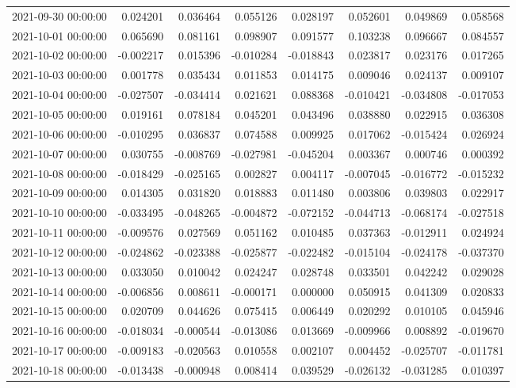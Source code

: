 \begin{tabular}{lrrrrrrr}
2021-09-30 00:00:00 & 0.024201 & 0.036464 & 0.055126 & 0.028197 & 0.052601 & 0.049869 & 0.058568 \\
2021-10-01 00:00:00 & 0.065690 & 0.081161 & 0.098907 & 0.091577 & 0.103238 & 0.096667 & 0.084557 \\
2021-10-02 00:00:00 & -0.002217 & 0.015396 & -0.010284 & -0.018843 & 0.023817 & 0.023176 & 0.017265 \\
2021-10-03 00:00:00 & 0.001778 & 0.035434 & 0.011853 & 0.014175 & 0.009046 & 0.024137 & 0.009107 \\
2021-10-04 00:00:00 & -0.027507 & -0.034414 & 0.021621 & 0.088368 & -0.010421 & -0.034808 & -0.017053 \\
2021-10-05 00:00:00 & 0.019161 & 0.078184 & 0.045201 & 0.043496 & 0.038880 & 0.022915 & 0.036308 \\
2021-10-06 00:00:00 & -0.010295 & 0.036837 & 0.074588 & 0.009925 & 0.017062 & -0.015424 & 0.026924 \\
2021-10-07 00:00:00 & 0.030755 & -0.008769 & -0.027981 & -0.045204 & 0.003367 & 0.000746 & 0.000392 \\
2021-10-08 00:00:00 & -0.018429 & -0.025165 & 0.002827 & 0.004117 & -0.007045 & -0.016772 & -0.015232 \\
2021-10-09 00:00:00 & 0.014305 & 0.031820 & 0.018883 & 0.011480 & 0.003806 & 0.039803 & 0.022917 \\
2021-10-10 00:00:00 & -0.033495 & -0.048265 & -0.004872 & -0.072152 & -0.044713 & -0.068174 & -0.027518 \\
2021-10-11 00:00:00 & -0.009576 & 0.027569 & 0.051162 & 0.010485 & 0.037363 & -0.012911 & 0.024924 \\
2021-10-12 00:00:00 & -0.024862 & -0.023388 & -0.025877 & -0.022482 & -0.015104 & -0.024178 & -0.037370 \\
2021-10-13 00:00:00 & 0.033050 & 0.010042 & 0.024247 & 0.028748 & 0.033501 & 0.042242 & 0.029028 \\
2021-10-14 00:00:00 & -0.006856 & 0.008611 & -0.000171 & 0.000000 & 0.050915 & 0.041309 & 0.020833 \\
2021-10-15 00:00:00 & 0.020709 & 0.044626 & 0.075415 & 0.006449 & 0.020292 & 0.010105 & 0.045946 \\
2021-10-16 00:00:00 & -0.018034 & -0.000544 & -0.013086 & 0.013669 & -0.009966 & 0.008892 & -0.019670 \\
2021-10-17 00:00:00 & -0.009183 & -0.020563 & 0.010558 & 0.002107 & 0.004452 & -0.025707 & -0.011781 \\
2021-10-18 00:00:00 & -0.013438 & -0.000948 & 0.008414 & 0.039529 & -0.026132 & -0.031285 & 0.010397 \\

\end{tabular}
